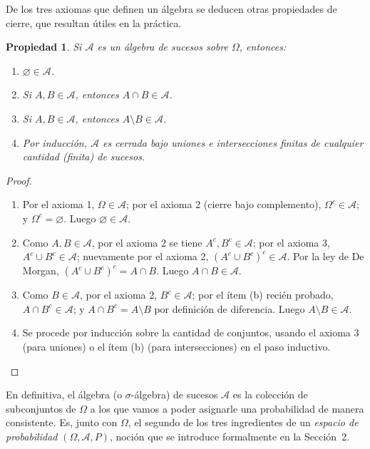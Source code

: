\documentclass[11pt,a4paper]{article}
\theoremstyle{plain}
\newtheorem{propiedad}[teorema]{Propiedad}
\theoremstyle{definition}
\theoremstyle{remark}
\begin{document}
De los tres axiomas que definen un álgebra se deducen otras propiedades de cierre, que resultan útiles en la práctica.

\begin{propiedad}
Si $\mathcal{A}$ es un álgebra de sucesos sobre $\Omega$, entonces:
\begin{enumerate}[label=(\alph*)]
\item $\varnothing \in \mathcal{A}$.
\item Si $A,B\in\mathcal{A}$, entonces $A\cap B \in \mathcal{A}$.
\item Si $A,B \in \mathcal{A}$, entonces $A\setminus B \in \mathcal{A}$.
\item Por inducción, $\mathcal{A}$ es cerrada bajo uniones e intersecciones finitas de cualquier cantidad (finita) de sucesos.
\end{enumerate}
\end{propiedad}

\begin{proof}
\begin{enumerate}[label=(\alph*)]
\item Por el axioma 1, $\Omega \in \mathcal{A}$; por el axioma 2 (cierre bajo complemento), $\Omega^c \in \mathcal{A}$; y $\Omega^c = \varnothing$. Luego $\varnothing \in \mathcal{A}$.
\item Como $A,B\in\mathcal{A}$, por el axioma 2 se tiene $A^c, B^c \in \mathcal{A}$; por el axioma 3, $A^c \cup B^c \in \mathcal{A}$; nuevamente por el axioma 2, $(A^c\cup B^c)^c \in \mathcal{A}$. Por la ley de De Morgan, $(A^c\cup B^c)^c = A\cap B$. Luego $A\cap B \in \mathcal{A}$.
\item Como $B \in \mathcal{A}$, por el axioma 2, $B^c \in \mathcal{A}$; por el ítem (b) recién probado, $A\cap B^c \in \mathcal{A}$; y $A\cap B^c = A\setminus B$ por definición de diferencia. Luego $A\setminus B \in \mathcal{A}$.
\item Se procede por inducción sobre la cantidad de conjuntos, usando el axioma 3 (para uniones) o el ítem (b) (para intersecciones) en el paso inductivo.
\end{enumerate}
\end{proof}

En definitiva, el álgebra (o $\sigma$-álgebra) de sucesos $\mathcal{A}$ es la colección de subconjuntos de $\Omega$ a los que vamos a poder asignarle una probabilidad de manera consistente. Es, junto con $\Omega$, el segundo de los tres ingredientes de un \emph{espacio de probabilidad} $(\Omega, \mathcal{A}, P)$, noción que se introduce formalmente en la Sección~2.
\end{document}
